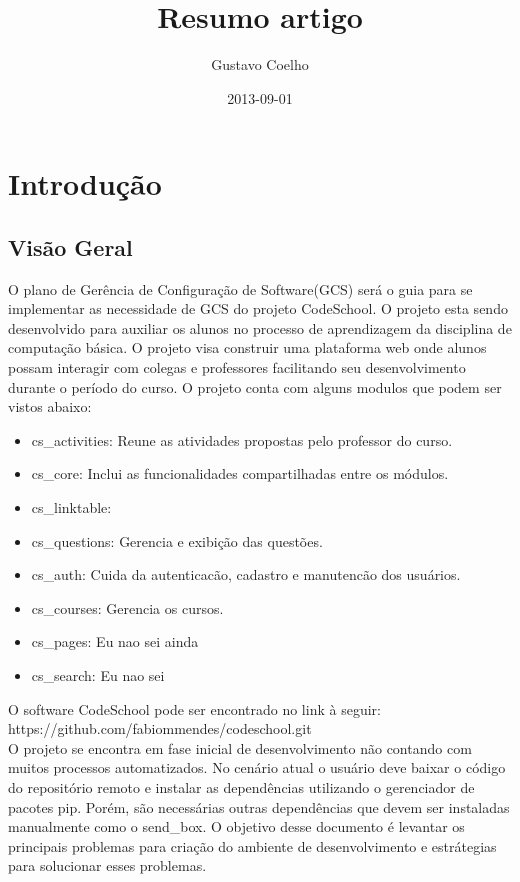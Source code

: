 \documentclass{article}
\title{Resumo artigo}
\date{2013-09-01}
\author{Gustavo Coelho}
\begin{document}


\tableofcontents{}
\newpage

\section{Introdução}
\subsection{Visão Geral}
 O plano de Gerência de Configuração de Software(GCS) será o guia para se implementar as necessidade de GCS do projeto CodeSchool. O projeto esta sendo desenvolvido para auxiliar os alunos no processo de aprendizagem da disciplina de computação básica. O projeto visa construir uma plataforma web onde alunos possam interagir com colegas e professores facilitando seu desenvolvimento durante o período do curso. O projeto conta com alguns modulos que podem ser vistos abaixo: 

\begin{itemize}
    \item[] cs\_activities: Reune as atividades propostas pelo professor do curso.
    \item[] cs\_core: Inclui as funcionalidades compartilhadas entre os módulos. 
    \item[] cs\_linktable:  
    \item[] cs\_questions: Gerencia e exibição das questões. 
    \item[] cs\_auth: Cuida da autenticacão, cadastro e manutencão dos usuários. 
    \item[] cs\_courses: Gerencia os cursos. 
    \item[] cs\_pages: Eu nao sei ainda 
    \item[] cs\_search: Eu nao sei 
\end{itemize}

O software CodeSchool pode ser encontrado no link à seguir:\\

https://github.com/fabiommendes/codeschool.git \\

O projeto se encontra em fase inicial de desenvolvimento não contando com muitos processos automatizados. No cenário atual o usuário deve baixar o código do repositório remoto e instalar as dependências utilizando o gerenciador de pacotes pip. Porém, são necessárias outras dependências que devem ser instaladas manualmente como o send\_box. O objetivo desse documento é levantar os principais problemas para criação do ambiente de desenvolvimento e estrátegias para solucionar esses problemas.
\end{document}
